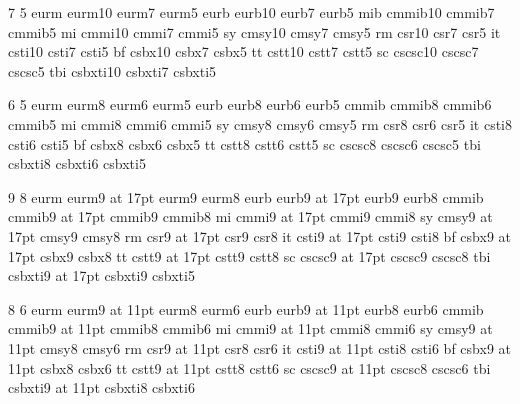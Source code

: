 \newfam\eurmfam
\newfam\eurbfam
\newfam\mibfam
\newfam\scfam
\newfam\bifam

 7 5
\loadfonts eurm  {eurm10}   {eurm7}   {eurm5}
\loadfonts eurb  {eurb10}   {eurb7}   {eurb5}
\loadfonts mib   {cmmib10}  {cmmib7}  {cmmib5}
\loadfonts mi    {cmmi10}   {cmmi7}   {cmmi5}
\loadfonts sy    {cmsy10}   {cmsy7}   {cmsy5}
\loadfonts rm    {csr10}    {csr7}    {csr5}
\loadfonts it    {csti10}   {csti7}   {csti5}
\loadfonts bf    {csbx10}   {csbx7}   {csbx5}
\loadfonts tt    {cstt10}   {cstt7}   {cstt5}
\loadfonts sc    {cscsc10}  {cscsc7}  {cscsc5}
\loadfonts tbi   {csbxti10} {csbxti7} {csbxti5}

\def\tenfonts{\setsizes 10 7 5 \setallfams\rm}

 6 5
\loadfonts eurm  {eurm8}  {eurm6}  {eurm5}
\loadfonts eurb  {eurb8}  {eurb6}  {eurb5}
\loadfonts cmmib {cmmib8} {cmmib6} {cmmib5}
\loadfonts mi    {cmmi8}  {cmmi6}  {cmmi5}
\loadfonts sy    {cmsy8}  {cmsy6}  {cmsy5}
\loadfonts rm    {csr8}   {csr6}   {csr5}
\loadfonts it    {csti8}  {csti6}  {csti5}
\loadfonts bf    {csbx8}  {csbx6}  {csbx5}
\loadfonts tt    {cstt8}  {cstt6}  {cstt5}
\loadfonts sc    {cscsc8} {cscsc6} {cscsc5}
\loadfonts tbi   {csbxti8} {csbxti6} {csbxti5}


\def\eightfonts{\setsizes 8 6 5 \setallfams\rm}

 9 8
\loadfonts eurm  {eurm9 at 17pt}  {eurm9}  {eurm8}
\loadfonts eurb  {eurb9 at 17pt}  {eurb9}  {eurb8}
\loadfonts cmmib {cmmib9 at 17pt} {cmmib9} {cmmib8}
\loadfonts mi    {cmmi9 at 17pt}  {cmmi9}  {cmmi8}
\loadfonts sy    {cmsy9 at 17pt}  {cmsy9}  {cmsy8}
\loadfonts rm    {csr9 at 17pt}   {csr9}   {csr8}
\loadfonts it    {csti9 at 17pt}  {csti9}  {csti8}
\loadfonts bf    {csbx9 at 17pt}  {csbx9}  {csbx8}
\loadfonts tt    {cstt9 at 17pt}  {cstt9}  {cstt8}
\loadfonts sc    {cscsc9 at 17pt} {cscsc9} {cscsc8}
\loadfonts tbi   {csbxti9 at 17pt} {csbxti9} {csbxti5}

\def\fonttitle{\setsizes 17 9 8 \setallfams\rm}

 8 6
\loadfonts eurm  {eurm9 at 11pt}   {eurm8}   {eurm6}
\loadfonts eurb  {eurb9 at 11pt}   {eurb8}   {eurb6}
\loadfonts cmmib {cmmib9 at 11pt}  {cmmib8}  {cmmib6}
\loadfonts mi    {cmmi9 at 11pt}   {cmmi8}   {cmmi6}
\loadfonts sy    {cmsy9 at 11pt}   {cmsy8}   {cmsy6}
\loadfonts rm    {csr9 at 11pt}    {csr8}    {csr6}
\loadfonts it    {csti9 at 11pt}   {csti8}   {csti6}
\loadfonts bf    {csbx9 at 11pt}   {csbx8}   {csbx6}
\loadfonts tt    {cstt9 at 11pt}   {cstt8}   {cstt6}
\loadfonts sc    {cscsc9 at 11pt}  {cscsc8}  {cscsc6}
\loadfonts tbi   {csbxti9 at 11pt} {csbxti8} {csbxti6}


